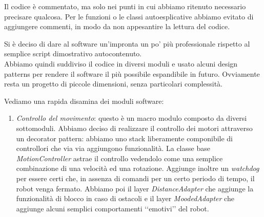 \documentclass[12pt]{article}
\newcommand{\cbegin}{‘‘}
\newcommand{\cend}{’’}
\begin{document}
Il codice è commentato, ma solo nei punti in cui abbiamo ritenuto necessario precisare qualcosa. Per le funzioni o le classi autoesplicative abbiamo evitato di aggiungere commenti, in modo da non appesantire la lettura del codice.

Si è deciso di dare al software un'impronta un po' più professionale rispetto al semplice script dimostrativo autocontenuto.\\
Abbiamo quindi suddiviso il codice in diversi moduli e usato alcuni design patterns per rendere il software il più possibile espandibile in futuro. Ovviamente resta un progetto di piccole dimensioni, senza particolari complessità.

Vediamo una rapida disamina dei moduli software:
\begin{enumerate}
\item \emph{Controllo del movimento}: questo è un macro modulo composto da diversi sottomoduli. Abbiamo deciso di realizzare il controllo dei motori attraverso un decorator pattern: abbiamo uno stack liberamente componibile di controllori che via via aggiungono funzionalità. La classe base \emph{MotionController} astrae il controllo vedendolo come una semplice combinazione di una velocità ed una rotazione. Aggiunge inoltre un \emph{watchdog} per essere certi che, in assenza di comandi per un certo periodo di tempo, il robot venga fermato. Abbiamo poi il layer \emph{DistanceAdapter} che aggiunge la funzionalità di blocco in caso di ostacoli e il layer \emph{MoodedAdapter} che aggiunge alcuni semplici comportamenti \cbegin{}emotivi\cend{} del robot.\\
\begin{figure}[h]

\end{figure}
\end{enumerate}
\end{document}
